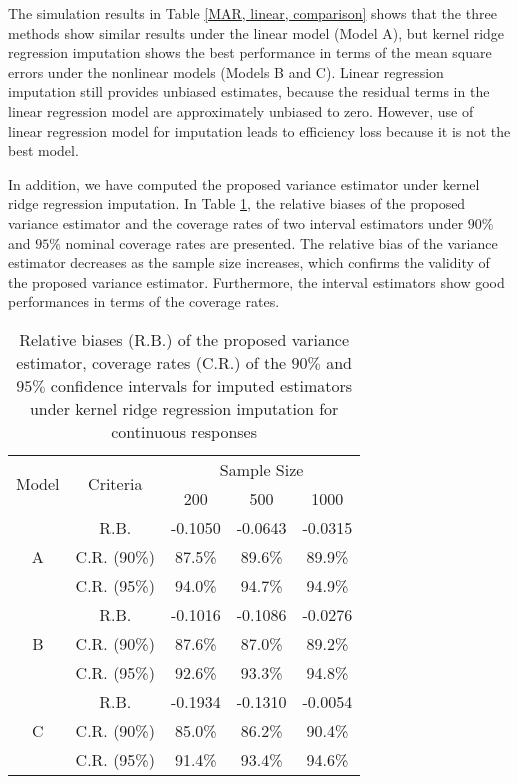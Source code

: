 \documentclass[12pt]{article}
\begin{document}
The simulation results in  Table \ref{MAR, linear, comparison} shows that  the three methods show similar results under the linear model (Model A), but   kernel ridge regression imputation shows the best performance in terms of {the mean square errors} under the nonlinear models (Models B and C). Linear regression imputation still provides unbiased estimates, because the residual terms in the linear regression model are  approximately unbiased to zero. However, use of linear regression model for imputation leads to efficiency loss because it is not the best model. 



In addition, we have computed the proposed variance estimator under kernel ridge regression imputation. 
In Table \ref{MAR, linear, KRR}, the relative biases of the proposed variance estimator  and the coverage rates of two interval estimators under $90\%$ and $95\%$ nominal coverage rates are presented. 
The relative bias of the variance estimator decreases as the sample size increases, which confirms  the validity of the proposed variance estimator. Furthermore, the interval estimators show good performances in terms of the coverage rates. 






\begin{table}[!ht]
\centering
\caption{Relative biases (R.B.)  of the proposed variance estimator, coverage rates (C.R.) of the $90\%$ and $95\%$ confidence intervals for imputed estimators under kernel ridge regression imputation for continuous responses}\label{MAR, linear, KRR}
\begin{tabular}{ccccc}
  \hline
\multirow{2}{*}{Model} & \multirow{2}{*}{Criteria}  & \multicolumn{3}{c}{Sample Size} \\
  \cline{3-5} 
    &  &   200 & 500 & 1000 \\ 
  \hline
 \multirow{3}{*}{A} & R.B. & -0.1050 & -0.0643 & -0.0315 \\ 
 &  C.R. (90\%) & 87.5\% & 89.6\% & 89.9\% \\ 
 &  C.R. (95\%)  & 94.0\% & 94.7\% & 94.9\% \\ 
 \hline
\multirow{3}{*}{B} & R.B. &-0.1016 & -0.1086 & -0.0276 \\ 
 & C.R. (90\%) & 87.6\% & 87.0\% & 89.2\% \\ 
 & C.R. (95\%)  & 92.6\% & 93.3\% & 94.8\% \\ 
   \hline
 \multirow{3}{*}{C} &  R.B. & -0.1934 & -0.1310 & -0.0054 \\
 &  C.R. (90\%)  & 85.0\% & 86.2\% & 90.4\% \\ 
 &  C.R. (95\%)  & 91.4\% & 93.4\% & 94.6\% \\ 
 \hline
\end{tabular}
\end{table}
\end{document}
